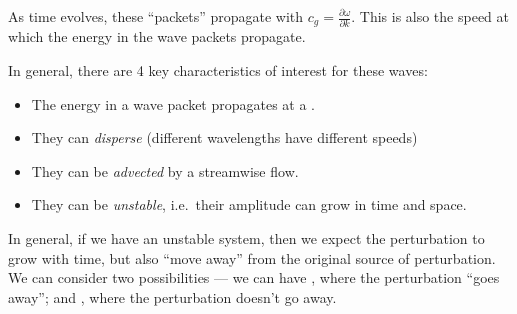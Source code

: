 \documentclass[a4paper]{article}
\begin{document}
As time evolves, these ``packets'' propagate with  $c_g = \frac{\partial \omega}{\partial k}$. This is also the speed at which the energy in the wave packets propagate.

In general, there are 4 key characteristics of interest for these waves:
\begin{itemize}
  \item The energy in a wave packet propagates at a .
  \item They can \emph{disperse} (different wavelengths have different speeds)
  \item They can be \emph{advected} by a streamwise flow.
  \item They can be \emph{unstable}, i.e.\ their amplitude can grow in time and space.
\end{itemize}

In general, if we have an unstable system, then we expect the perturbation to grow with time, but also ``move away'' from the original source of perturbation. We can consider two possibilities --- we can have , where the perturbation ``goes away''; and , where the perturbation doesn't go away.
\end{document}
